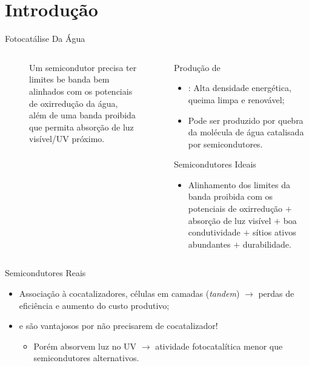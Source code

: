 \section{Introdução}

\begin{frame}[allowframebreaks]{Fotocatálise Da Água}
	\begin{columns}
		\begin{column}{.5\textwidth}
			\begin{figure}[t]
				\centering
				\def\svgwidth{\linewidth}
				
				\caption{Um semicondutor precisa ter limites be banda bem alinhados com os potenciais de oxirredução da água, além de uma banda proibida que permita absorção de luz visível/UV próximo.}
			\end{figure}
		\end{column}
		\begin{column}{.5\textwidth}
			\begin{block}{Produção de }
				\begin{itemize}
					\item {}: Alta densidade energética, queima limpa e renovável;
					\item Pode ser produzido por quebra da molécula de água catalisada por semicondutores.
				\end{itemize}
			\end{block}
			\begin{block}{Semicondutores Ideais}
				\begin{itemize}
					\item Alinhamento dos limites da banda proibida com os potenciais de oxirredução $+$ absorção de luz visível $+$ boa condutividade $+$ sítios ativos abundantes $+$ durabilidade.
				\end{itemize}
			\end{block}
		\end{column}
	\end{columns}\framebreak
	\begin{block}{Semicondutores Reais}
		\begin{itemize}
			\item Associação à cocatalizadores, células em camadas (\textit{tandem}) $\to$ perdas de eficiência e aumento do custo produtivo;
			\item \alert{ e  são vantajosos por não precisarem de cocatalizador!}
			\begin{itemize}
				\item Porém absorvem luz no UV $\to$ atividade fotocatalítica menor que semicondutores alternativos.

\end{itemize}
\end{itemize}
\end{block}
\end{frame}
